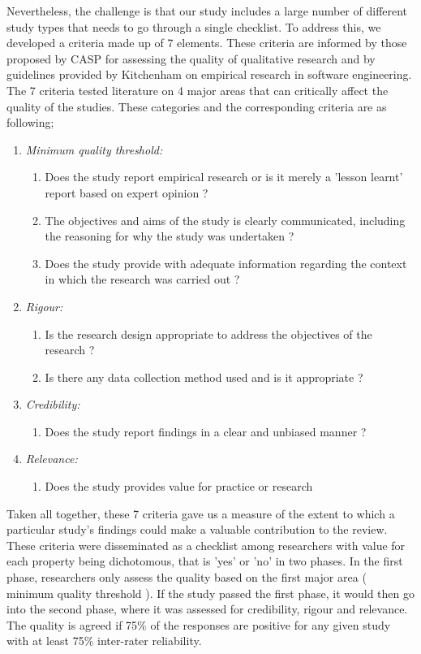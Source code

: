 \documentclass{ieeeaccess}
\begin{document}
Nevertheless, the challenge is that our study includes a large number of different study types that needs to go through a single checklist. To address this, we developed a criteria made up of 7 elements. These criteria are informed by those proposed by CASP for assessing the quality of qualitative research \cite{tools2018checklists} and by guidelines provided by Kitchenham \cite{kitchenham2002preliminary} on empirical research in software engineering. The 7 criteria tested literature on 4 major areas that can critically affect the quality of the studies. These categories and the corresponding criteria are as following;

\begin{enumerate}
    \item \emph{Minimum quality threshold:} 
    \begin{enumerate}
        \item Does the study report empirical research or is it merely a 'lesson learnt' report based on expert opinion ?
        \item The objectives and aims of the study is clearly communicated, including the reasoning for why the study was undertaken ? 
        \item Does the study provide with adequate information regarding the context in which the research was carried out ?
    \end{enumerate}
    \item \emph{Rigour:}
    \begin{enumerate}
        \item Is the research design appropriate to address the objectives of the research ?
        \item Is there any data collection method used and is it appropriate ?
    \end{enumerate}
    \item \emph{Credibility:}
      \begin{enumerate}
        \item Does the study report findings in a clear and unbiased manner ? 
     \end{enumerate}
    \item \emph{Relevance:}
    \begin{enumerate}
        \item Does the study provides value for practice or research 
     \end{enumerate}
\end{enumerate}

Taken all together, these 7 criteria gave us a measure of the extent to which a particular study's findings could make a valuable contribution to the review. These criteria were disseminated as a checklist among researchers with value for each property being dichotomous, that is 'yes' or 'no' in two phases. In the first phase, researchers only assess the quality based on the first major area ( minimum quality threshold ). If the study passed the first phase, it would then go into the second phase, where it was assessed for credibility, rigour and relevance. The quality is agreed if 75\% of the responses are positive for any given study with at least 75\% inter-rater reliability. 
\end{document}

